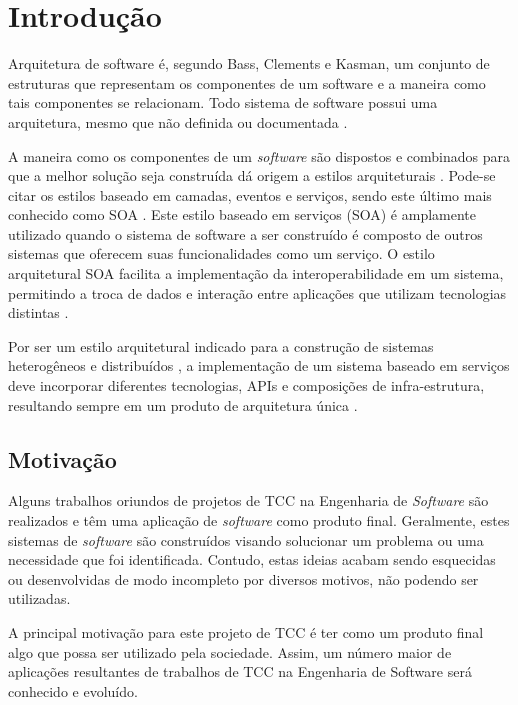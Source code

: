 \chapter[Introdução]{Introdução}
Arquitetura de software é, segundo Bass, Clements e Kasman\cite{bass_software_archi_practice_2003}, um conjunto de estruturas que representam os componentes de um software e a maneira como tais componentes se relacionam. Todo sistema de software possui uma arquitetura, mesmo que não definida ou documentada \cite{bass_software_archi_practice_2003}.

A maneira como os componentes de um \textit{software} são dispostos e combinados para que a melhor solução seja construída dá origem a estilos arquiteturais \cite{pressman2006engenharia}. Pode-se citar os estilos baseado em camadas, eventos e serviços, sendo este último mais conhecido como SOA \cite{josuttis_soa_2007}. Este estilo baseado em serviços (SOA) é amplamente utilizado quando o sistema de software a ser construído é composto de outros sistemas que oferecem suas funcionalidades como um serviço. O estilo arquitetural SOA facilita a implementação da interoperabilidade em um sistema, permitindo a troca de dados e interação entre aplicações que utilizam tecnologias distintas \cite{oqueesoa_2010}.

Por ser um estilo arquitetural indicado para a construção de sistemas heterogêneos e distribuídos \cite{josuttis_soa_2007}, a implementação de um sistema baseado em serviços deve incorporar diferentes tecnologias, APIs e composições de infra-estrutura, resultando sempre em um produto de arquitetura única \cite{erl_orientacaoaservico_2009}.

\section{Motivação}
Alguns trabalhos oriundos de projetos de TCC na Engenharia de \textit{Software} são realizados e têm uma aplicação de \textit{software} como produto final. Geralmente, estes sistemas de \textit{software} são construídos visando solucionar um problema ou uma necessidade que foi identificada. Contudo, estas ideias acabam sendo esquecidas ou desenvolvidas de modo incompleto por diversos motivos, não podendo ser utilizadas.

A principal motivação para este projeto de TCC é ter como um produto final algo que possa ser utilizado pela sociedade. Assim, um número maior de aplicações resultantes de trabalhos de TCC na Engenharia de Software será conhecido e evoluído. 

